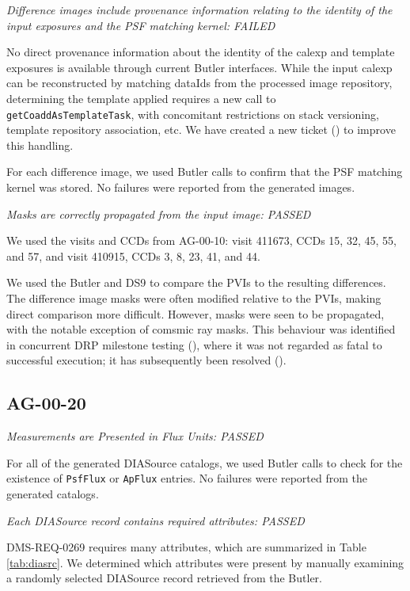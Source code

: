 \documentclass[DM,lsstdraft,STR,toc]{lsstdoc}
\begin{document}
\textit{Difference images include provenance information relating to the 
identity of the input exposures and the PSF matching kernel:  FAILED}

No direct provenance information about the identity of the calexp and template
exposures is available through current Butler interfaces.  While the input
calexp can be reconstructed by matching dataIds from the processed image
repository, determining the template applied requires a new call to
\texttt{getCoaddAsTemplateTask}, with concomitant restrictions on
stack versioning, template repository association, etc.
We have created a new ticket () to improve this handling.

For each difference image, we used Butler calls to confirm that the PSF matching kernel was stored.  No failures were reported from the generated images.

\textit{Masks are correctly propagated from the input image: PASSED}

We used the visits and CCDs from AG-00-10:
visit 411673, CCDs 15, 32, 45, 55, and 57, and
visit 410915, CCDs 3,  8, 23, 41, and 44.

We used the Butler and DS9 to compare the PVIs to the resulting differences.
The difference image masks were often modified relative to the PVIs, making
direct comparison more difficult. However, masks were seen to be propagated,
with the notable exception of comsmic ray masks. This behaviour was identified
in concurrent DRP milestone testing (), where it was not
regarded as fatal to successful execution; it has subsequently been resolved
().

\subsection{AG-00-20}
\label{sect:ag-00-20}

\textit{Measurements are Presented in Flux Units: PASSED }

For all of the generated DIASource catalogs, we used Butler calls to check for
the existence of \texttt{PsfFlux} or \texttt{ApFlux} entries.  No failures were
reported from the generated catalogs.

\textit{Each DIASource record contains required attributes: PASSED}

DMS-REQ-0269 requires many attributes, which are summarized in Table
\ref{tab:diasrc}.  We determined which attributes were present by manually
examining a randomly selected DIASource record retrieved from the Butler.
\end{document}
